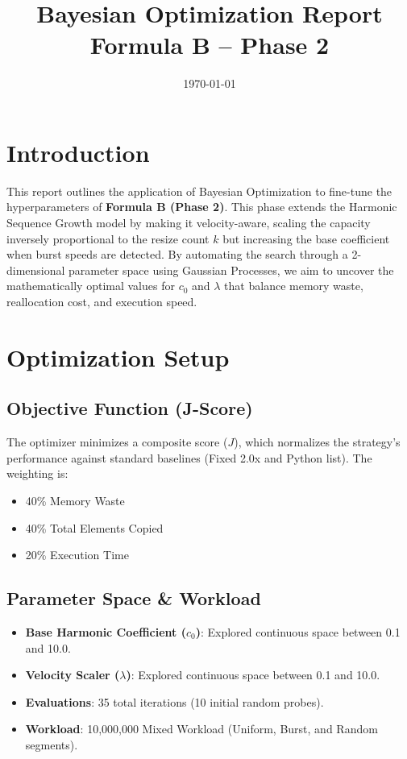 \documentclass[11pt, a4paper]{article}
\title{Bayesian Optimization Report \\ \Large Formula B -- Phase 2}
\author{}
\date{\today}
\begin{document}
\maketitle
\tableofcontents
\listoffigures
\listoftables
\newpage

\section{Introduction}
This report outlines the application of Bayesian Optimization to fine-tune the hyperparameters of \textbf{Formula B (Phase 2)}. This phase extends the Harmonic Sequence Growth model by making it velocity-aware, scaling the capacity inversely proportional to the resize count $k$ but increasing the base coefficient when burst speeds are detected. By automating the search through a 2-dimensional parameter space using Gaussian Processes, we aim to uncover the mathematically optimal values for $c_0$ and $\lambda$ that balance memory waste, reallocation cost, and execution speed.

\section{Optimization Setup}

\subsection{Objective Function (J-Score)}
The optimizer minimizes a composite score ($J$), which normalizes the strategy's performance against standard baselines (Fixed 2.0x and Python list). The weighting is:
\begin{itemize}
    \item 40\% Memory Waste
    \item 40\% Total Elements Copied
    \item 20\% Execution Time
\end{itemize}

\subsection{Parameter Space \& Workload}
\begin{itemize}
    \item \textbf{Base Harmonic Coefficient ($c_0$)}: Explored continuous space between 0.1 and 10.0.
    \item \textbf{Velocity Scaler ($\lambda$)}: Explored continuous space between 0.1 and 10.0.
    \item \textbf{Evaluations}: 35 total iterations (10 initial random probes).
    \item \textbf{Workload}: 10,000,000 Mixed Workload (Uniform, Burst, and Random segments).
\end{itemize}
\end{document}
